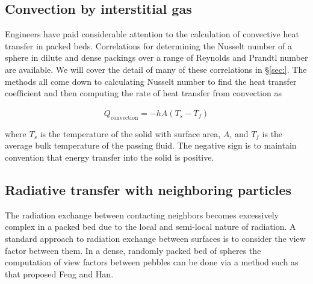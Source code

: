 \subsection{Convection by interstitial gas}

Engineers have paid considerable attention to the calculation of convective heat transfer in packed beds. Correlations for determining the Nusselt number of a sphere in dilute and dense packings over a range of Reynolds and Prandtl number are available. We will cover the detail of many of these correlations in \S\ref{sec:}. The methods all come down to calculating Nusselt number to find the heat transfer coefficient and then computing the rate of heat transfer from convection as

\begin{equation}
	\dot{Q}_\text{convection} = -hA(T_s-T_f)
\end{equation}

where $T_s$ is the temperature of the solid with surface area, $A$, and $T_f$ is the average bulk temperature of the passing fluid. The negative sign is to maintain convention that energy transfer into the solid is positive.





\subsection{Radiative transfer with neighboring particles}

The radiation exchange between contacting neighbors becomes excessively complex in a packed bed due to the local and semi-local nature of radiation. A standard approach to radiation exchange between surfaces is to consider the view factor between them. In a dense, randomly packed bed of spheres the computation of view factors between pebbles can be done via a method such as that proposed Feng and Han\cite{Feng2012}. 
